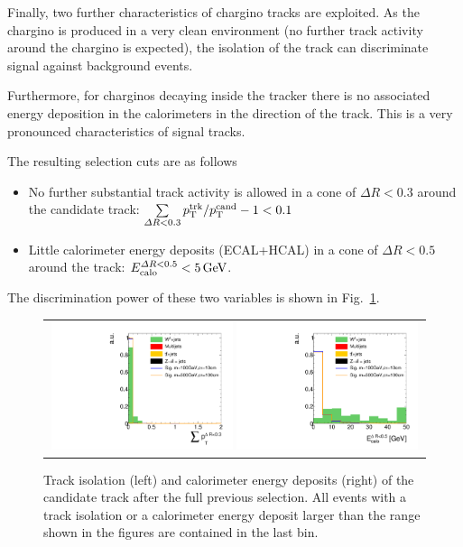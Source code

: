 Finally, two further characteristics of chargino tracks are exploited.
As the chargino is produced in a very clean environment (no further track activity around the chargino is expected), the isolation of the track can discriminate signal against background events.

Furthermore, for charginos decaying inside the tracker there is no associated energy deposition in the calorimeters in the direction of the track.
This is a very pronounced characteristics of signal tracks.

The resulting selection cuts are as follows
\begin{itemize}
\renewcommand{\labelitemi}{\footnotesize{\ding{118}}}
\item No further substantial track activity is allowed in a cone of $\Delta R < 0.3$ around the candidate track: \mbox{$\sum \limits_{\Delta R < 0.3} p_{\text{T}}^{\text{trk}}/p_{\text{T}}^{\text{cand}} - 1 < 0.1$}
\item Little calorimeter energy deposits (ECAL+HCAL) in a cone of $\Delta R < 0.5$ around the track: \mbox{$E^{\Delta R<0.5}_{\text{calo}}<5\,\text{Ge}\kern-0.06667em\text{V}$}.
\end{itemize}
The discrimination power of these two variables is shown in Fig.~\ref{fig:TrackIso_Ecalo_After_Preselection}.\\
\begin{figure}[!h]
  \centering 
  \begin{tabular}{c}
    \includegraphics[width=0.49\textwidth]{figures/analysis/AnalysisSelection/chiTracksCandidateSelectionTrigger_2Signals_FullBkg/htrackIsolation_lin.pdf}
    \includegraphics[width=0.49\textwidth]{figures/analysis/AnalysisSelection/chiTracksCandidateSelectionTrigger_2Signals_FullBkg/htrackCaloIsolation_lin.pdf}
  \end{tabular}
  \caption{Track isolation (left) and calorimeter energy deposits (right) of the candidate track after the full previous selection. 
           All events with a track isolation or a calorimeter energy deposit larger than the range shown in the figures are contained in the last bin.}
  \label{fig:TrackIso_Ecalo_After_Preselection}
\end{figure}

